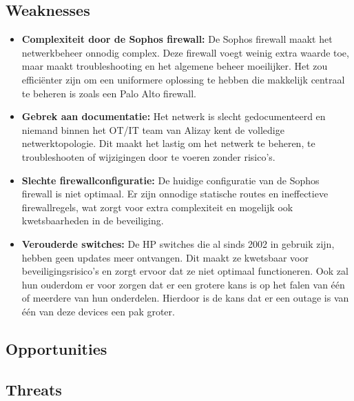 \subsection{Weaknesses}

\begin{itemize}
\item \textbf{Complexiteit door de Sophos firewall:} De Sophos firewall maakt het netwerkbeheer onnodig complex. Deze firewall voegt weinig extra waarde toe, maar maakt troubleshooting en het algemene beheer moeilijker. Het zou efficiënter zijn om een uniformere oplossing te hebben die makkelijk centraal te beheren is zoals een Palo Alto firewall.

\item \textbf{Gebrek aan documentatie:} Het netwerk is slecht gedocumenteerd en niemand binnen het OT/IT team van Alizay kent de volledige netwerktopologie. Dit maakt het lastig om het netwerk te beheren, te troubleshooten of wijzigingen door te voeren zonder risico’s.

\item \textbf{Slechte firewallconfiguratie:} De huidige configuratie van de Sophos firewall is niet optimaal. Er zijn onnodige statische routes en ineffectieve firewallregels, wat zorgt voor extra complexiteit en mogelijk ook kwetsbaarheden in de beveiliging.

\item \textbf{Verouderde switches:} De HP switches die al sinds 2002 in gebruik zijn, hebben geen updates meer ontvangen. Dit maakt ze kwetsbaar voor beveiligingsrisico’s en zorgt ervoor dat ze niet optimaal functioneren. Ook zal hun ouderdom er voor zorgen dat er een grotere kans is op het falen van één of meerdere van hun onderdelen. Hierdoor is de kans dat er een outage is van één van deze devices een pak groter. 
\end{itemize}
    
\subsection{Opportunities}

\begin{itemize}

\end{itemize}


\subsection{Threats}


